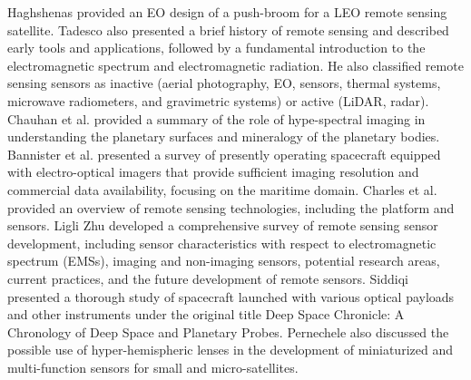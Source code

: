 \documentclass[final,5p,times,twocolumn]{elsarticle}
\begin{document}
Haghshenas \citep{haghshenas2014electro} provided an EO design of a push-broom for a LEO remote sensing satellite. Tadesco \citep{tedesco2015remote} also presented a brief history of remote sensing and described early tools and applications, followed by a fundamental introduction to the electromagnetic spectrum and electromagnetic radiation. He also classified remote sensing sensors as inactive (aerial photography, EO, sensors, thermal systems, microwave radiometers, and gravimetric systems) or active (LiDAR, radar). Chauhan et al. \citep{chauhan2015hyperspectral} provided a summary of the role of hype-spectral imaging in understanding the planetary surfaces and mineralogy of the planetary bodies.  Bannister et al. \cite{bannister2015maritime} presented a survey of presently operating spacecraft equipped with electro-optical imagers that provide sufficient imaging resolution and commercial data availability, focusing on the maritime domain. Charles et al. \citep{toth2016remote} provided an overview of remote sensing technologies, including the platform and sensors.  Ligli Zhu \citep{zhu2018review} developed a comprehensive survey of remote sensing sensor development, including sensor characteristics with respect to electromagnetic spectrum (EMSs), imaging and non-imaging sensors, potential research areas, current practices, and the future development of remote sensors. Siddiqi \citep{siddiqi2018beyond} presented a thorough study of spacecraft launched with various optical payloads and other instruments under the original title Deep Space Chronicle: A Chronology of Deep Space and Planetary Probes. Pernechele \citep{pernechele2018hyper} also discussed the possible use of hyper-hemispheric lenses in the development of miniaturized and multi-function sensors for small and micro-satellites.\\
\end{document}
